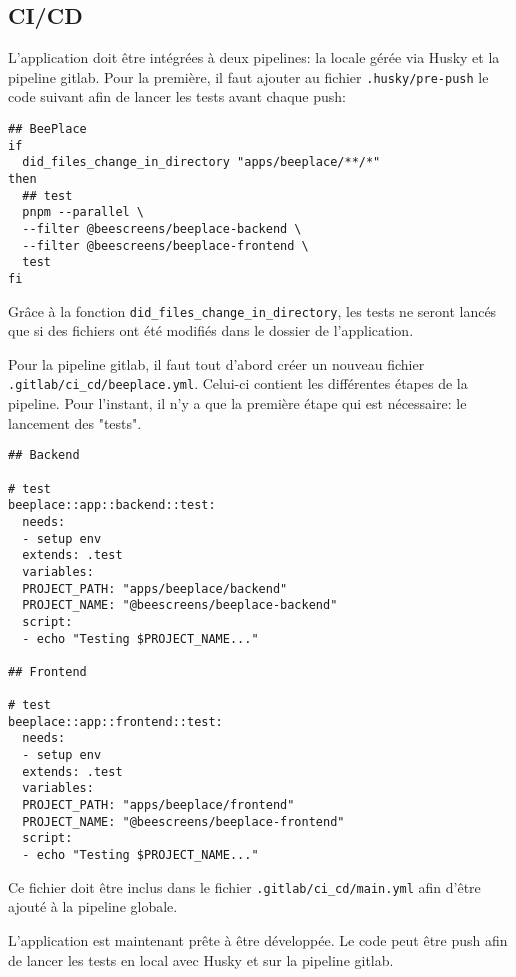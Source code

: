 \subsection{CI/CD}

L'application doit être intégrées à deux pipelines: la locale gérée via Husky et la pipeline \gls{gitlab}. Pour la première, il faut ajouter au fichier \texttt{.husky/pre-push} le code suivant afin de lancer les tests avant chaque push:

\begin{verbatim}
## BeePlace
if
  did_files_change_in_directory "apps/beeplace/**/*"
then
  ## test
  pnpm --parallel \
  --filter @beescreens/beeplace-backend \
  --filter @beescreens/beeplace-frontend \
  test
fi
\end{verbatim}

Grâce à la fonction \texttt{did_files_change_in_directory}, les tests ne seront lancés que si des fichiers ont été modifiés dans le dossier de l'application.

Pour la pipeline \gls{gitlab}, il faut tout d'abord créer un nouveau fichier \texttt{.gitlab/ci_cd/beeplace.yml}. Celui-ci contient les différentes étapes de la pipeline. Pour l'instant, il n'y a que la première étape qui est nécessaire: le lancement des "tests".

\begin{verbatim}
## Backend

# test
beeplace::app::backend::test:
  needs:
  - setup env
  extends: .test
  variables:
  PROJECT_PATH: "apps/beeplace/backend"
  PROJECT_NAME: "@beescreens/beeplace-backend"
  script:
  - echo "Testing $PROJECT_NAME..."

## Frontend

# test
beeplace::app::frontend::test:
  needs:
  - setup env
  extends: .test
  variables:
  PROJECT_PATH: "apps/beeplace/frontend"
  PROJECT_NAME: "@beescreens/beeplace-frontend"
  script:
  - echo "Testing $PROJECT_NAME..."
\end{verbatim}

Ce fichier doit être inclus dans le fichier \texttt{.gitlab/ci_cd/main.yml} afin d'être ajouté à la pipeline globale.

L'application est maintenant prête à être développée. Le code peut être push afin de lancer les tests en local avec Husky et sur la pipeline \gls{gitlab}.